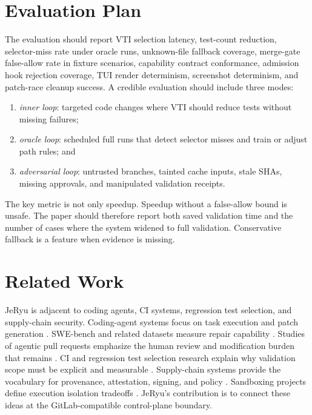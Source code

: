 \documentclass[conference]{IEEEtran}
\begin{document}
\section{Evaluation Plan}
The evaluation should report VTI selection latency, test-count reduction, selector-miss rate under oracle runs, unknown-file fallback coverage, merge-gate false-allow rate in fixture scenarios, capability contract conformance, admission hook rejection coverage, TUI render determinism, screenshot determinism, and patch-race cleanup success. A credible evaluation should include three modes:

\begin{enumerate}
\item \emph{inner loop}: targeted code changes where VTI should reduce tests without missing failures;
\item \emph{oracle loop}: scheduled full runs that detect selector misses and train or adjust path rules; and
\item \emph{adversarial loop}: untrusted branches, tainted cache inputs, stale SHAs, missing approvals, and manipulated validation receipts.
\end{enumerate}

The key metric is not only speedup. Speedup without a false-allow bound is unsafe. The paper should therefore report both saved validation time and the number of cases where the system widened to full validation. Conservative fallback is a feature when evidence is missing.

\section{Related Work}
JeRyu is adjacent to coding agents, CI systems, regression test selection, and supply-chain security. Coding-agent systems focus on task execution and patch generation \cite{openai-codex,github-openai-codex,openhands-paper,sweagent-paper,aider-repo}. SWE-bench and related datasets measure repair capability \cite{swebench,swebench-verified,aidev-dataset}. Studies of agentic pull requests emphasize the human review and modification burden that remains \cite{failed-agentic-prs,agent-prs-unmerged,agent-pr-modifications}. CI and regression test selection research explain why validation scope must be explicit and measurable \cite{continuous-integration,regression-test-selection-survey,safe-regression-test-selection,test-prioritization}. Supply-chain systems provide the vocabulary for provenance, attestation, signing, and policy \cite{slsa,in-toto,sigstore,rustsec}. Sandboxing projects define execution isolation tradeoffs \cite{gvisor,firecracker,bubblewrap}. JeRyu's contribution is to connect these ideas at the GitLab-compatible control-plane boundary.
\end{document}
